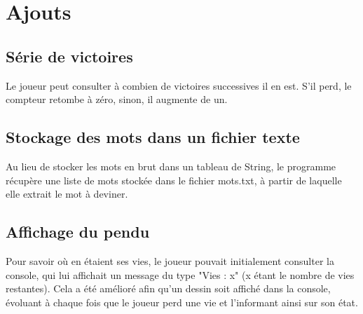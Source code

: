 \documentclass{report}
\begin{document}
\chapter{Ajouts}
\section{Série de victoires}
Le joueur peut consulter à combien de victoires successives il en est. S'il perd, le compteur retombe à zéro, sinon, il augmente de un.
\section{Stockage des mots dans un fichier texte}
Au lieu de stocker les mots en brut dans un tableau de String, le programme récupère une liste de mots stockée dans le fichier mots.txt, à partir de laquelle elle extrait le mot à deviner.

\section{Affichage du pendu}
Pour savoir où en étaient ses vies, le joueur pouvait initialement consulter la console, qui lui affichait un message du type "Vies : x" (x étant le nombre de vies restantes). Cela a été amélioré afin qu'un dessin soit affiché dans la console, évoluant à chaque fois que le joueur perd une vie et l'informant ainsi sur son état.
\end{document}
